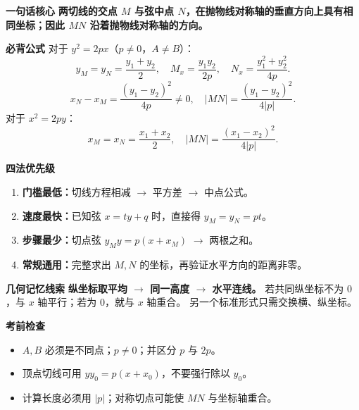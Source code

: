 \clearpage
\begin{summarybox}
\textbf{\textcolor{CSummary}{一句话核心}}
\textbf{两切线的交点 $M$ 与弦中点 $N$，在抛物线对称轴的垂直方向上具有相同坐标；因此 $MN$ 沿着抛物线对称轴的方向。}

\medskip
\textbf{\textcolor{CSummary}{必背公式}}
对于 $y^2=2px$（$p\ne0$，$A\ne B$）：
\[
\boxed{y_M=y_N=\frac{y_1+y_2}{2}},\quad
\boxed{M_x=\frac{y_1y_2}{2p}},\quad
\boxed{N_x=\frac{y_1^2+y_2^2}{4p}}.
\]
\[
\boxed{x_N-x_M=\frac{(y_1-y_2)^2}{4p}\ne0},\quad
\boxed{|MN|=\frac{(y_1-y_2)^2}{4|p|}}.
\]
对于 $x^2=2py$：
\[
\boxed{x_M=x_N=\frac{x_1+x_2}{2}},\quad
\boxed{|MN|=\frac{(x_1-x_2)^2}{4|p|}}.
\]

\medskip
\textbf{\textcolor{CSummary}{四法优先级}}
\begin{enumerate}[leftmargin=*,itemsep=0.3em]
\item \textbf{门槛最低：}切线方程相减 $\rightarrow$ 平方差 $\rightarrow$ 中点公式。
\item \textbf{速度最快：}已知弦 $x=ty+q$ 时，直接得 $y_M=y_N=pt$。
\item \textbf{步骤最少：}切点弦 $y_My=p(x+x_M)$ $\rightarrow$ 两根之和。
\item \textbf{常规通用：}完整求出 $M,N$ 的坐标，再验证水平方向的距离非零。
\end{enumerate}

\medskip
\textbf{\textcolor{CSummary}{几何记忆线索}}
\textbf{纵坐标取平均 $\rightarrow$ 同一高度 $\rightarrow$ 水平连线。}
若共同纵坐标不为 $0$，与 $x$ 轴平行；若为 $0$，就与 $x$ 轴重合。
另一个标准形式只需交换横、纵坐标。

\medskip
\textbf{\textcolor{CSummary}{考前检查}}
\begin{itemize}[leftmargin=*,itemsep=0.2em,topsep=0.3em]
\item $A,B$ 必须是不同点；$p\ne0$；并区分 $p$ 与 $2p$。
\item 顶点切线可用 $yy_0=p(x+x_0)$，不要强行除以 $y_0$。
\item 计算长度必须用 $|p|$；对称切点可能使 $MN$ 与坐标轴重合。
\end{itemize}
\end{summarybox}
